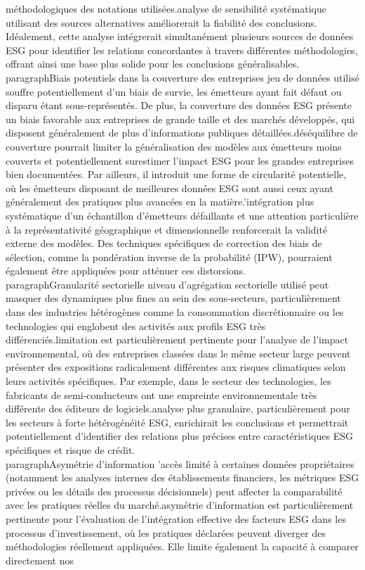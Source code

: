 méthodologiques des notations utilisées.\n\nUne analyse de sensibilité systématique utilisant des sources alternatives améliorerait la fiabilité des conclusions. Idéalement, cette analyse intégrerait simultanément plusieurs sources de données ESG pour identifier les relations concordantes à travers différentes méthodologies, offrant ainsi une base plus solide pour les conclusions généralisables.\n\n\\paragraph{Biais potentiels dans la couverture des entreprises} \nLe jeu de données utilisé souffre potentiellement d'un biais de survie, les émetteurs ayant fait défaut ou disparu étant sous-représentés. De plus, la couverture des données ESG présente un biais favorable aux entreprises de grande taille et des marchés développés, qui disposent généralement de plus d'informations publiques détaillées.\n\nCe déséquilibre de couverture pourrait limiter la généralisation des modèles aux émetteurs moins couverts et potentiellement surestimer l'impact ESG pour les grandes entreprises bien documentées. Par ailleurs, il introduit une forme de circularité potentielle, où les émetteurs disposant de meilleures données ESG sont aussi ceux ayant généralement des pratiques plus avancées en la matière.\n\nL'intégration plus systématique d'un échantillon d'émetteurs défaillants et une attention particulière à la représentativité géographique et dimensionnelle renforcerait la validité externe des modèles. Des techniques spécifiques de correction des biais de sélection, comme la pondération inverse de la probabilité (IPW), pourraient également être appliquées pour atténuer ces distorsions.\n\n\\paragraph{Granularité sectorielle} \nLe niveau d'agrégation sectorielle utilisé peut masquer des dynamiques plus fines au sein des sous-secteurs, particulièrement dans des industries hétérogènes comme la consommation discrétionnaire ou les technologies qui englobent des activités aux profils ESG très différenciés.\n\nCette limitation est particulièrement pertinente pour l'analyse de l'impact environnemental, où des entreprises classées dans le même secteur large peuvent présenter des expositions radicalement différentes aux risques climatiques selon leurs activités spécifiques. Par exemple, dans le secteur des technologies, les fabricants de semi-conducteurs ont une empreinte environnementale très différente des éditeurs de logiciels.\n\nUne analyse plus granulaire, particulièrement pour les secteurs à forte hétérogénéité ESG, enrichirait les conclusions et permettrait potentiellement d'identifier des relations plus précises entre caractéristiques ESG spécifiques et risque de crédit.\n\n\\paragraph{Asymétrie d'information} \nL'accès limité à certaines données propriétaires (notamment les analyses internes des établissements financiers, les métriques ESG privées ou les détails des processus décisionnels) peut affecter la comparabilité avec les pratiques réelles du marché.\n\nCette asymétrie d'information est particulièrement pertinente pour l'évaluation de l'intégration effective des facteurs ESG dans les processus d'investissement, où les pratiques déclarées peuvent diverger des méthodologies réellement appliquées. Elle limite également la capacité à comparer directement nos 